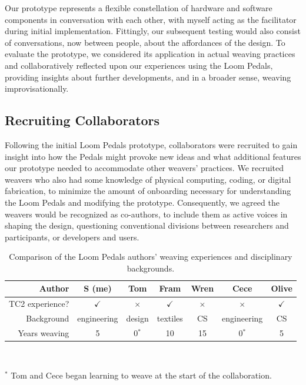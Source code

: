 Our prototype represents a flexible constellation of hardware and software components in conversation with each other, with myself acting as the facilitator during initial implementation. Fittingly, our subsequent testing would also consist of conversations, now between people, about the affordances of the design. To evaluate the prototype, we considered its application in actual weaving practices and collaboratively reflected upon our experiences using the Loom Pedals, providing insights about further developments, and in a broader sense, weaving improvisationally.

\subsection{Recruiting Collaborators}

Following the initial Loom Pedals prototype, collaborators were recruited to gain insight into how the Pedals might provoke new ideas and what additional features our prototype needed to accommodate other weavers’ practices. We recruited weavers who also had some knowledge of physical computing, coding, or digital fabrication, to minimize the amount of onboarding necessary for understanding the Loom Pedals and modifying the prototype. Consequently, we agreed the weavers would be recognized as co-authors, to include them as active voices in shaping the design, questioning conventional divisions between researchers and participants, or developers and users.

\begin{table}
 \caption{Comparison of the Loom Pedals authors' weaving experiences and disciplinary backgrounds.}
 \label{table-authors}
 \begin{tabular}{r|c|c|c|c|c|c}
 \toprule
   Author & S (me) & Tom & Fram & Wren & Cece & Olive \\ \midrule
   {TC2 experience?} & $\checkmark$ & $\times$ & $\checkmark$ & $\times$ & $\times$ & $\checkmark$ \\
   {Background} & engineering & design & textiles & CS & engineering & CS \\
   {Years weaving} & 5 & 0$^\ast$ & 10 & 15 & 0$^\ast$ & 5 \\
   \bottomrule
   \end{tabular} \\ \vspace{0.5em}
   
   \footnotesize{$^\ast$ Tom and Cece began learning to weave at the start of the collaboration.}
\end{table}

